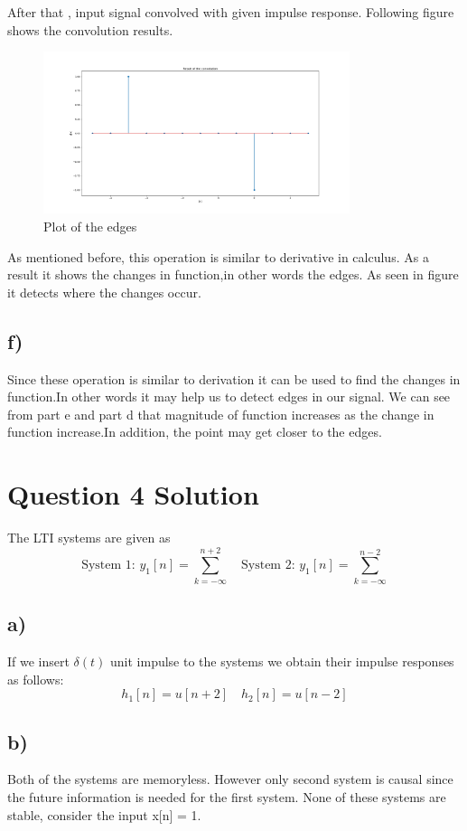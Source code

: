 \documentclass[letterpaper,12pt]{article}
\begin{document}
After that , input signal convolved with given impulse response. Following figure shows the convolution results.
    \begin{figure}[H]
        \centering
        \includegraphics[width = 0.8\textwidth]{edge_plot.png}
        \caption{Plot of the edges}
        \end{figure} 
As mentioned before, this operation is similar to derivative in calculus. As a result it shows the changes in function,in other words the edges. As seen in figure it detects where the changes occur.
\subsection{f)}
Since these operation is similar to derivation it can be used to find the changes in function.In other words it may help us to detect edges in our signal. We can see from part e and part d that magnitude of function increases as the change in function increase.In addition, the point may get closer to the edges.
\section{Question 4 Solution}
The LTI systems are given as 
\[
\text{System 1: }    y_1[n] = \sum_{k = -\infty}^{n +2} \quad  \text{System 2: }    y_1[n] = \sum_{k = -\infty}^{n-2}  
\]

\subsection{a)}
If we insert \(\delta(t)\) unit impulse to the systems we obtain their impulse responses as follows:
\[h_1[n]=u[n+2]   \quad h_2[n]=u[n-2]\] 
\subsection{b)}
Both of the systems are memoryless. However only second system is causal since the future information is needed for the first system. None of these systems are stable, consider the input x[n] = 1. 
\end{document}
